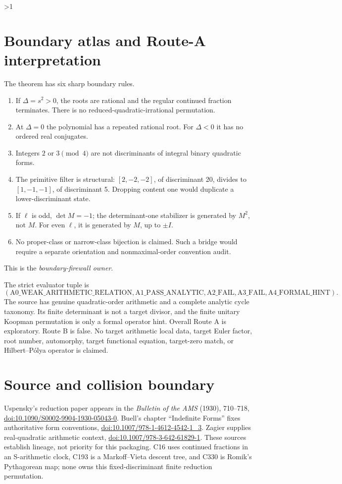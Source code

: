 \documentclass[10pt]{article}
\providecommand{\CRevisionRound}{2}
\begin{document}
\ifnum\CRevisionRound>1
\section{Boundary atlas and Route-A interpretation}
The theorem has six sharp boundary rules.
\begin{enumerate}
\item If \(\Delta=s^2>0\), the roots are rational and the regular continued
fraction terminates.  There is no reduced-quadratic-irrational permutation.
\item At \(\Delta=0\) the polynomial has a repeated rational root.  For
\(\Delta<0\) it has no ordered real conjugates.
\item Integers \(2\) or \(3\pmod4\) are not discriminants of integral binary
quadratic forms.
\item The primitive filter is structural: \([2,-2,-2]\), of discriminant
20, divides to \([1,-1,-1]\), of discriminant 5.  Dropping content one would
duplicate a lower-discriminant state.
\item If \(\ell\) is odd, \(\det M=-1\); the determinant-one stabilizer is
generated by \(M^2\), not \(M\).  For even \(\ell\), it is generated by
\(M\), up to \(\pm I\).
\item No proper-class or narrow-class bijection is claimed.  Such a bridge
would require a separate orientation and nonmaximal-order convention audit.
\end{enumerate}
This is the \emph{boundary-firewall owner}.

The strict evaluator tuple is
\[
 (\mathrm{A0\_WEAK\_ARITHMETIC\_RELATION},
  \mathrm{A1\_PASS\_ANALYTIC},
  \mathrm{A2\_FAIL},
  \mathrm{A3\_FAIL},
  \mathrm{A4\_FORMAL\_HINT}).
\]
The source has genuine quadratic-order arithmetic and a complete analytic
cycle taxonomy.  Its finite determinant is not a target divisor, and the
finite unitary Koopman permutation is only a formal operator hint.  Overall
Route A is exploratory.  Route B is false.  No target arithmetic local data,
target Euler factor, root number, automorphy, target functional equation,
target-zero match, or Hilbert--P\'olya operator is claimed.
\fi

\section*{Source and collision boundary}
Uspensky's reduction paper appears in the \emph{Bulletin of the AMS} (1930),
710--718,
\href{https://doi.org/10.1090/S0002-9904-1930-05043-0}{doi:10.1090/S0002-9904-1930-05043-0}.
Buell's chapter ``Indefinite Forms'' fixes authoritative form conventions,
\href{https://doi.org/10.1007/978-1-4612-4542-1_3}{doi:10.1007/978-1-4612-4542-1\_3}.
Zagier supplies real-quadratic arithmetic context,
\href{https://doi.org/10.1007/978-3-642-61829-1}{doi:10.1007/978-3-642-61829-1}.
These sources establish lineage, not priority for this packaging.  C16 uses
continued fractions in an S-arithmetic clock, C193 is a Markoff--Vieta
descent tree, and C330 is Romik's Pythagorean map; none owns this
fixed-discriminant finite reduction permutation.
\end{document}
